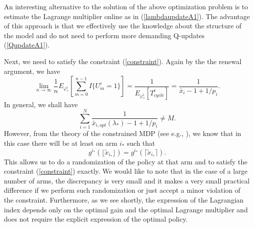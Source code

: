\documentclass[12pt]{article}
\numberwithin{equation}{section}
\newcommand{\1}{\textbf{1}}
\begin{document}
An interesting alternative to the solution of the above optimization problem
is to estimate the Lagrange multiplier online as in (\ref{lambdaupdateA1}).
The advantage of this approach is that we effectively use the knowledge about
the structure of the model and do not need to perform more demanding Q-updates (\ref{QupdateA1}).

Next, we need to satisfy the constraint (\ref{constraint}). Again by the the renewal argument,
we have 
$$
\lim_{n\to\infty} \frac{1}{n} E_{\varphi^i_*} \left[ \sum_{m=0}^{n-1} I\{U^i_m=1\} \right]
= \frac{1}{E_{\varphi^i_*}[T^i_{cycle}]} = \frac{1}{\bar{x}_i - 1 + 1/p_i}.
$$
In general, we shall have
$$
\sum_{i=1}^{N} \frac{1}{\bar{x}_{i,opt}(\lambda_*) - 1 + 1/p_i} \neq M.
$$
However, from the theory of the constrained MDP (see e.g., \cite{Altman, BorkarConstrained, BorkarConstraint, Piunov}), we
know that in this case there will be at least on arm $i_*$ such that 
$$
g^{i_*}(\lfloor \tilde{x}_{i_*} \rfloor) = g^{i_*}(\lceil\tilde{x}_{i_*}\rceil).
$$
This allows us to do a randomization of the policy at that arm and to satisfy
the constraint (\ref{constraint}) exactly. We would like to note that in the
case of a large number of arms, the discrepancy is very small and it makes a 
very small practical difference if we perform such randomization or just accept
a minor violation of the constraint. Furthermore, as we see shortly, the expression
of the Lagrangian index depends only on the optimal gain and the optimal Lagrange
multiplier and does not require the explicit expression of the optimal policy. 
\end{document}
